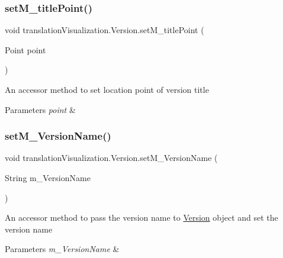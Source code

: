 \subsubsection{\texorpdfstring{set\+M\+\_\+title\+Point()}{setM\_titlePoint()}}
{\footnotesize\ttfamily void translation\+Visualization.\+Version.\+set\+M\+\_\+title\+Point (\begin{DoxyParamCaption}\item[{Point}]{point }\end{DoxyParamCaption})\hspace{0.3cm}{\ttfamily [inline]}}

An accessor method to set location point of version title 
\begin{DoxyParams}{Parameters}
{\em point} & \\
\hline
\end{DoxyParams}
\mbox{\label{classtranslation_visualization_1_1_version_a292cc8922a96f69f299b3eb12e4f6bae}} 
\subsubsection{\texorpdfstring{set\+M\+\_\+\+Version\+Name()}{setM\_VersionName()}}
{\footnotesize\ttfamily void translation\+Visualization.\+Version.\+set\+M\+\_\+\+Version\+Name (\begin{DoxyParamCaption}\item[{String}]{m\+\_\+\+Version\+Name }\end{DoxyParamCaption})\hspace{0.3cm}{\ttfamily [inline]}}

An accessor method to pass the version name to \hyperlink{classtranslation_visualization_1_1_version}{Version} object and set the version name 
\begin{DoxyParams}{Parameters}
{\em m\+\_\+\+Version\+Name} & \\
\hline
\end{DoxyParams}
\mbox{\label{classtranslation_visualization_1_1_version_a6850428c26c2d1e29ab34042b25a00d5}} 
